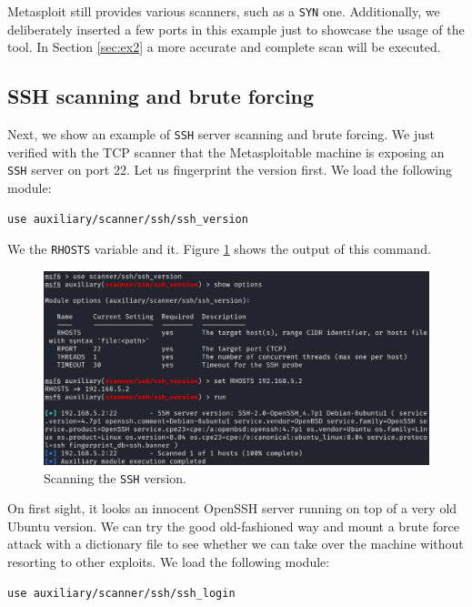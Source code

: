 Metasploit still provides various scanners, such as a \texttt{SYN} one. Additionally, we deliberately inserted a few ports in this example just to showcase the usage of the tool. In Section \ref{sec:ex2} a more accurate and complete scan will be executed.

\subsection{SSH scanning and brute forcing}

Next, we show an example of \texttt{SSH} server scanning and brute forcing. We just verified with the TCP scanner that the Metasploitable machine is exposing an \texttt{SSH} server on port 22. Let us fingerprint the version first. We load the following module:

\begin{lstlisting}
use auxiliary/scanner/ssh/ssh_version
\end{lstlisting}

We  the \texttt{RHOSTS} variable and  it. Figure \ref{fig:ex1:ssh} shows the output of this command.

\begin{figure}[htbp]
	\centering
	\includegraphics[width=\textwidth]{../drawable/exercise_1_screenshots/es1-ssh.jpg}
	\caption{Scanning the \texttt{SSH} version.}
	\label{fig:ex1:ssh}
\end{figure}

On first sight, it looks an innocent OpenSSH server running on top of a very old Ubuntu version. We can try the good old-fashioned way and mount a brute force attack with a dictionary file to see whether we can take over the machine without resorting to other exploits. We load the following module:

\begin{lstlisting}
use auxiliary/scanner/ssh/ssh_login
\end{lstlisting}

